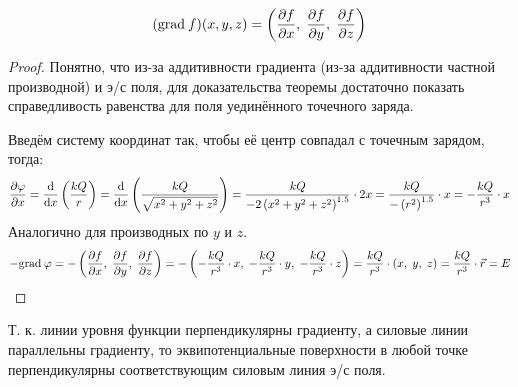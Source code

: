 \[ (\mathrm{grad}\: f)(x, y, z) = \left( \frac{\partial f}{\partial x},\;\frac{\partial f}{\partial y},\;\frac{\partial f}{\partial z} \right) \]

\begin{proof}
	Понятно, что из-за аддитивности градиента (из-за аддитивности частной производной) и э/с поля, для доказательства теоремы достаточно показать справедливость равенства для поля уединённого точечного заряда.\par
	Введём систему координат так, чтобы её центр совпадал с точечным зарядом, тогда:
	\[ \frac{\partial \varphi}{\partial x} = \frac{\text{d}}{\text{d} x} \left( \frac{kQ}{r} \right) = \frac{\text{d}}{\text{d} x} \left( \frac{kQ}{\sqrt{x^2+y^2+z^2}} \right) = \frac{kQ}{-2 \left( x^2 + y^2 + z^2 \right)^{1.5}} \cdot 2x = \frac{kQ}{-\left( r^2 \right)^{1.5}} \cdot x = -\frac{kQ}{r^3} \cdot x\]
	Аналогично для производных по $y$ и $z$.
	\[ -\mathrm{grad}\: \varphi = -\left( \frac{\partial f}{\partial x},\;\frac{\partial f}{\partial y},\;\frac{\partial f}{\partial z} \right) = -\left( -\frac{kQ}{r^3} \cdot x,\; -\frac{kQ}{r^3} \cdot y,\; -\frac{kQ}{r^3} \cdot z \right) = \frac{kQ}{r^3} \cdot (x,\; y,\; z) = \frac{kQ}{r^3} \cdot \vec{r} = E \]
\end{proof}

Т. к. линии уровня функции перпендикулярны градиенту, а силовые линии параллельны градиенту, то эквипотенциальные поверхности в любой точке перпендикулярны соответствующим силовым линия э/с поля.